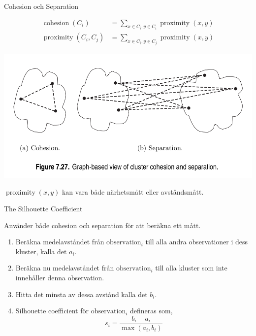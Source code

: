 \documentclass[10pt,english]{beamer}
\begin{document}
\begin{frame}{Cohesion och Separation}
    
    \begin{align*}
        \operatorname{cohesion}(C_i) &= \sum_{x \in C_i, y \in C_i} \operatorname{proximity}(x,y) \\
        \operatorname{proximity}(C_i, C_j) &= \sum_{x \in C_i, y \in C_j} \operatorname{proximity}(x,y)
    \end{align*}

    \includegraphics[width=.8\textwidth]{figs/cohesion and separation.1.png}

    $\operatorname{proximity}(x,y)$ kan vara både närhetsmått eller avståndsmått.

\end{frame}

\begin{frame}{The Silhouette Coefficient}
    
    Använder både cohesion och separation för att beräkna ett mått.

    \begin{enumerate}
        \item Beräkna medelavståndet från $\text{observation}_i$ till alla andra observationer i dess kluster, kalla det $a_i$.
        \item Beräkna nu medelavståndet från $\text{observation}_i$ till alla kluster som inte innehåller denna observation.
        \item Hitta det minsta av dessa avstånd kalla det $b_i$.
        \item Silhouette coefficient för $\text{observation}_i$ defineras som,
        \begin{equation*}
            s_i = \frac{b_i - a_i}{\max(a_i, b_i)}
        \end{equation*}
    \end{enumerate}

\end{frame}
\end{document}
